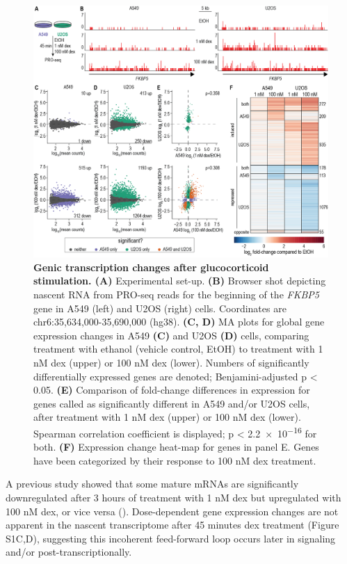 \documentclass{article}
\begin{document}
{\begin{figure}[ht!]
\includegraphics[width=\textwidth]{figures/Figure1_gene_expression_2021-04.png}
\caption{\textbf{Genic transcription changes after glucocorticoid stimulation. (A)} Experimental set-up. \textbf{(B)} Browser shot depicting nascent RNA from PRO-seq reads for the beginning of the \emph{FKBP5} gene in A549 (left) and U2OS (right) cells. Coordinates are chr6:35,634,000-35,690,000 (hg38). \textbf{(C, D)} MA plots for global gene expression changes in A549 \textbf{(C)} and U2OS \textbf{(D)} cells, comparing treatment with ethanol (vehicle control, EtOH) to treatment with 1 nM dex (upper) or 100 nM dex (lower). Numbers of significantly differentially expressed genes are denoted; Benjamini-adjusted p < 0.05. \textbf{(E)} Comparison of fold-change differences in expression for genes called as significantly different in A549 and/or U2OS cells, after treatment with 1 nM dex (upper) or 100 nM dex (lower). Spearman correlation coefficient is displayed; p < \num{2.2e-16} for both. \textbf{(F)} Expression change heat-map for genes in panel E. Genes have been categorized by their response to 100 nM dex treatment.}
\label{fig:fig1}
\end{figure}

A previous study showed that some mature mRNAs are significantly downregulated after 3 hours of treatment with 1 nM dex but upregulated with 100 nM dex, or vice versa (\cite{chen_incoherent_2013}). Dose-dependent gene expression changes are not apparent in the nascent transcriptome after 45 minutes dex treatment (Figure S1C,D), suggesting this incoherent feed-forward loop occurs later in signaling and/or post-transcriptionally. 

}
\end{document}
